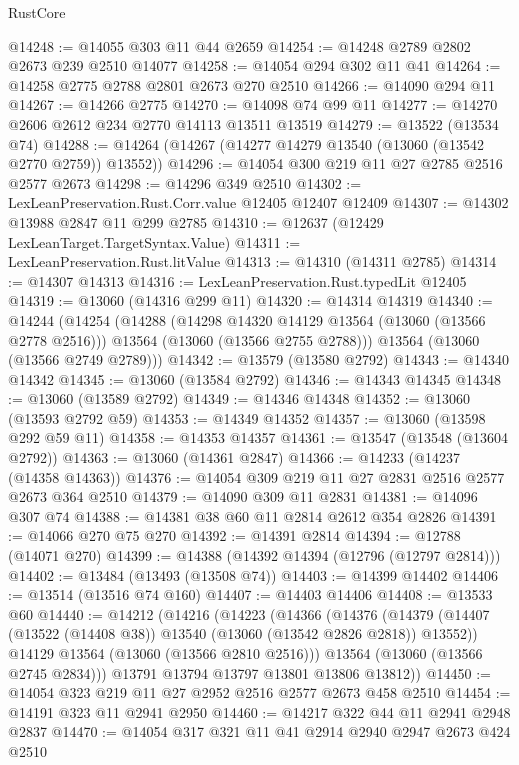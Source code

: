 \begin{lexlean}{RustCore}
\begin{coremodule}
@14248 := @14055 @303 @11 @44 @2659
@14254 := @14248 @2789 @2802 @2673 @239 @2510 @14077
@14258 := @14054 @294 @302 @11 @41
@14264 := @14258 @2775 @2788 @2801 @2673 @270 @2510
@14266 := @14090 @294 @11
@14267 := @14266 @2775
@14270 := @14098 @74 @99 @11
@14277 := @14270 @2606 @2612 @234 @2770 @14113 @13511 @13519
@14279 := @13522 (@13534 @74)
@14288 := @14264 (@14267 (@14277 @14279 @13540 (@13060 (@13542 @2770 @2759)) @13552))
@14296 := @14054 @300 @219 @11 @27 @2785 @2516 @2577 @2673
@14298 := @14296 @349 @2510
@14302 := LexLeanPreservation.Rust.Corr.value @12405 @12407 @12409
@14307 := @14302 @13988 @2847 @11 @299 @2785
@14310 := @12637 (@12429 LexLeanTarget.TargetSyntax.Value)
@14311 := LexLeanPreservation.Rust.litValue
@14313 := @14310 (@14311 @2785)
@14314 := @14307 @14313
@14316 := LexLeanPreservation.Rust.typedLit @12405
@14319 := @13060 (@14316 @299 @11)
@14320 := @14314 @14319
@14340 := @14244
    (@14254
      (@14288
        (@14298 @14320 @14129 @13564 (@13060 (@13566 @2778 @2516)))
        @13564
        (@13060 (@13566 @2755 @2788)))
      @13564
      (@13060 (@13566 @2749 @2789)))
@14342 := @13579 (@13580 @2792)
@14343 := @14340 @14342
@14345 := @13060 (@13584 @2792)
@14346 := @14343 @14345
@14348 := @13060 (@13589 @2792)
@14349 := @14346 @14348
@14352 := @13060 (@13593 @2792 @59)
@14353 := @14349 @14352
@14357 := @13060 (@13598 @292 @59 @11)
@14358 := @14353 @14357
@14361 := @13547 (@13548 (@13604 @2792))
@14363 := @13060 (@14361 @2847)
@14366 := @14233 (@14237 (@14358 @14363))
@14376 := @14054 @309 @219 @11 @27 @2831 @2516 @2577 @2673 @364 @2510
@14379 := @14090 @309 @11 @2831
@14381 := @14096 @307 @74
@14388 := @14381 @38 @60 @11 @2814 @2612 @354 @2826
@14391 := @14066 @270 @75 @270
@14392 := @14391 @2814
@14394 := @12788 (@14071 @270)
@14399 := @14388 (@14392 @14394 (@12796 (@12797 @2814)))
@14402 := @13484 (@13493 (@13508 @74))
@14403 := @14399 @14402
@14406 := @13514 (@13516 @74 @160)
@14407 := @14403 @14406
@14408 := @13533 @60
@14440 := @14212
    (@14216
      (@14223
        (@14366
          (@14376
            (@14379 (@14407 (@13522 (@14408 @38)) @13540 (@13060 (@13542 @2826 @2818)) @13552))
            @14129
            @13564
            (@13060 (@13566 @2810 @2516)))
          @13564
          (@13060 (@13566 @2745 @2834)))
        @13791
        @13794
        @13797
        @13801
        @13806
        @13812))
@14450 := @14054 @323 @219 @11 @27 @2952 @2516 @2577 @2673 @458 @2510
@14454 := @14191 @323 @11 @2941 @2950
@14460 := @14217 @322 @44 @11 @2941 @2948 @2837
@14470 := @14054 @317 @321 @11 @41 @2914 @2940 @2947 @2673 @424 @2510

\end{coremodule}
\end{lexlean}
